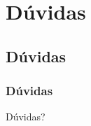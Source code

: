 \documentclass{beamer}
\begin{document}
\section*{Dúvidas}
\subsection*{Dúvidas}
\begin{frame}
    \frametitle{Dúvidas}

    \Large Dúvidas?
\end{frame}
\end{document}
